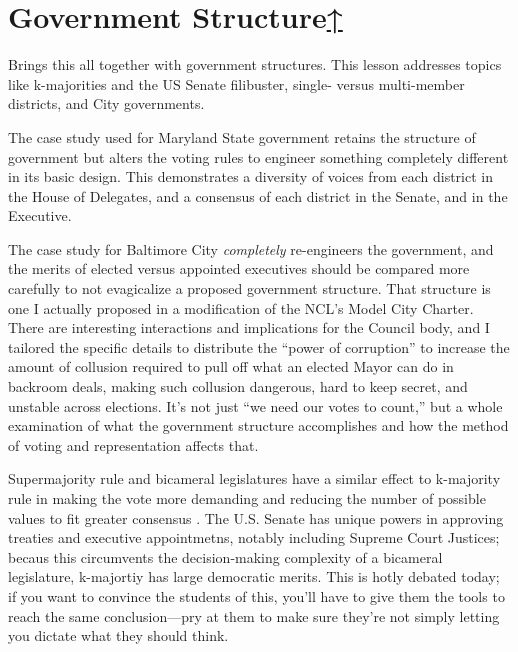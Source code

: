 \label{cur:government-structure}
\section{Government Structure\hyperref[syllabus]{↑}}

Brings this all together with government structures.  This lesson addresses topics like k-majorities and the US Senate filibuster, single- versus multi-member districts, and City governments.

The case study used for Maryland State government retains the structure of government but alters the voting rules to engineer something completely different in its basic design.  This demonstrates a diversity of voices from each district in the House of Delegates, and a consensus of each district in the Senate, and in the Executive.

The case study for Baltimore City \textit{completely} re-engineers the government, and the merits of elected versus appointed executives should be compared more carefully to not evagicalize a proposed government structure.  That structure is one I actually proposed in a modification of the NCL's Model City Charter.  There are interesting interactions and implications for the Council body, and I tailored the specific details to distribute the ``power of corruption'' to increase the amount of collusion required to pull off what an elected Mayor can do in backroom deals, making such collusion dangerous, hard to keep secret, and unstable across elections.  It's not just ``we need our votes to count,'' but a whole examination of what the government structure accomplishes and how the method of voting and representation affects that.

\begin{boxcomment}
    Supermajority rule and bicameral legislatures have a similar effect to k-majority rule in making the vote more demanding and reducing the number of possible values to fit greater consensus \autocite[180]{Heckelman2015}.  The U.S. Senate has unique powers in approving treaties and executive appointmetns, notably including Supreme Court Justices; becaus this circumvents the decision-making complexity of a bicameral legislature, k-majortiy has large democratic merits.  This is hotly debated today; if you want to convince the students of this, you'll have to give them the tools to reach the same conclusion—pry at them to make sure they're not simply letting you dictate what they should think.
\end{boxcomment}

